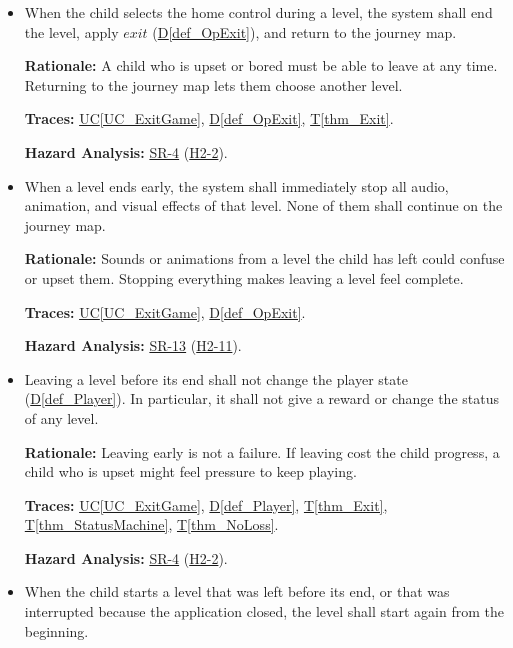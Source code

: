 \documentclass[12pt]{article}
\newcommand{\ucref}[1]{\hyperref[#1]{UC\ref*{#1}}}
\newcounter{reqnum} %
\newcommand{\thmref}[1]{\hyperref[#1]{T\ref*{#1}}}
\newcommand{\defref}[1]{\hyperref[#1]{D\ref*{#1}}}
\newcommand{\haurl}{https://team-hindsight.github.io/ophthamology-game/HazardAnalysis/HazardAnalysis.pdf}
\newcommand{\hasrref}[2]{\href{\haurl\#nameddest=sr:#1}{SR-#2}}
\newcommand{\hahazref}[2]{\href{\haurl\#nameddest=haz:#1}{H#2}}
\newcommand{\hazsr}[4]{\hasrref{#1}{#2} (\hahazref{#3}{#4})}
\begin{document}
\begin{itemize}

\item[\refstepcounter{reqnum}\textbf{FR\thereqnum}\label{FR_ExitLevel}:]
When the child selects the home control during a level, the system shall end
the level, apply $\mathit{exit}$ (\defref{def_OpExit}), and return to the
journey map.

\textbf{Rationale:} A child who is upset or bored must be able to leave at any
time. Returning to the journey map lets them choose another level.

\textbf{Traces:} \ucref{UC_ExitGame}, \defref{def_OpExit}, \thmref{thm_Exit}.

\textbf{Hazard Analysis:} \hazsr{GameplayRecovery}{4}{GameplayStuck}{2-2}.

\item[\refstepcounter{reqnum}\textbf{FR\thereqnum}\label{FR_StopOnExit}:]
When a level ends early, the system shall immediately stop all audio,
animation, and visual effects of that level. None of them shall continue on the
journey map.

\textbf{Rationale:} Sounds or animations from a level the child has left could confuse or
upset them. Stopping everything makes leaving a level feel complete.

\textbf{Traces:} \ucref{UC_ExitGame}, \defref{def_OpExit}.

\textbf{Hazard Analysis:} \hazsr{StopAudioVisualsOnExit}{13}{AudioVisualsContinueOnExit}{2-11}.

\item[\refstepcounter{reqnum}\textbf{FR\thereqnum}\label{FR_ExitKeepsData}:]
Leaving a level before its end shall not change the player state
(\defref{def_Player}). In particular, it shall not give a reward or change the
status of any level.

\textbf{Rationale:} Leaving early is not a failure. If leaving cost the child
progress, a child who is upset might feel pressure to keep playing.

\textbf{Traces:} \ucref{UC_ExitGame}, \defref{def_Player}, \thmref{thm_Exit},
\thmref{thm_StatusMachine}, \thmref{thm_NoLoss}.

\textbf{Hazard Analysis:} \hazsr{GameplayRecovery}{4}{GameplayStuck}{2-2}.

\item[\refstepcounter{reqnum}\textbf{FR\thereqnum}\label{FR_RestartAfterExit}:]
When the child starts a level that was left before its end, or that was
interrupted because the application closed, the level shall start again from
the beginning.


\end{itemize}
\end{document}
